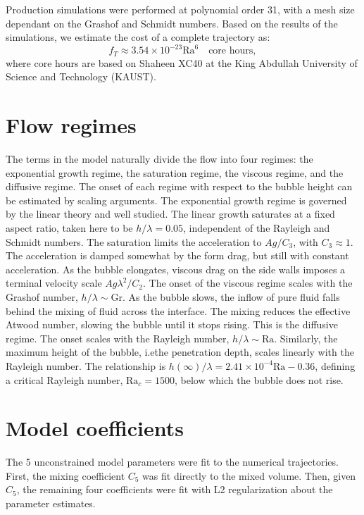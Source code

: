 Production simulations were performed at polynomial order 31, with a mesh size dependant on the Grashof and Schmidt numbers.
Based on the results of the simulations, we estimate the cost of a complete trajectory as:
\begin{equation}
f_T \approx 3.54 \times 10^{-23} \text{Ra}^6 \quad \text{core hours},
\end{equation}
where core hours are based on Shaheen XC40 at the King Abdullah University of Science and Technology (KAUST).

\section{Flow regimes}

The terms in the model naturally divide the flow into four regimes: the exponential growth regime, the saturation regime, the viscous regime, and the diffusive regime.
The onset of each regime with respect to the bubble height can be estimated by scaling arguments.
The exponential growth regime is governed by the linear theory and well studied.
The linear growth saturates at a fixed aspect ratio, taken here to be $h / \lambda = 0.05$, independent of the Rayleigh and Schmidt numbers. 
The saturation limits the acceleration to $A g / C_3$, with $C_3 \approx 1$.
The acceleration is damped somewhat by the form drag, but still with constant acceleration.
As the bubble elongates, viscous drag on the side walls imposes a terminal velocity scale $A g \lambda^2 / C_2$.
The onset of the viscous regime scales with the Grashof number, $h / \lambda \sim \text{Gr}$.
As the bubble slows, the inflow of pure fluid falls behind the mixing of fluid across the interface.
The mixing reduces the effective Atwood number, slowing the bubble until it stops rising.
This is the diffusive regime.
The onset scales with the Rayleigh number, $h / \lambda \sim \text{Ra}$.
Similarly, the maximum height of the bubble, i.e\. the penetration depth, scales linearly with the Rayleigh number.
The relationship is $h(\infty)/\lambda = 2.41 \times 10^{-4} \text{Ra} - 0.36$, defining a critical Rayleigh number, $\text{Ra}_c = 1500$, below which the bubble does not rise.

\section{Model coefficients}

The 5 unconstrained model parameters were fit to the numerical trajectories.
First, the mixing coefficient $C_5$ was fit directly to the mixed volume.
Then, given $C_5$, the remaining four coefficients were fit with L2 regularization about the parameter estimates.

